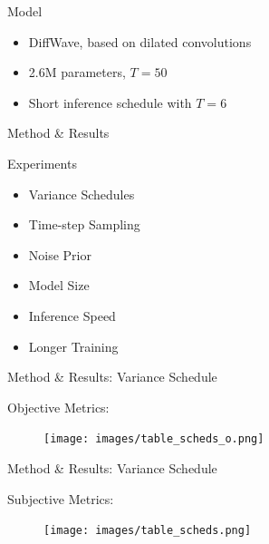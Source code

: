 \documentclass{beamer}
\begin{document}

\begin{frame}{Model}

\begin{itemize}
    \setlength\itemsep{1.5em}
    \item DiffWave, based on dilated convolutions
    \item 2.6M parameters, $T=50$
    \item Short inference schedule with $T=6$
\end{itemize}
    
\end{frame}



\begin{frame}{Method \& Results}

    Experiments

    \vspace{0.5cm}

    \begin{itemize}
        \setlength\itemsep{1.5em}
        \item Variance Schedules
        \item Time-step Sampling
        \item Noise Prior
        \item Model Size
        \item Inference Speed
        \item Longer Training
    \end{itemize}
    
\end{frame}


\begin{frame}{Method \& Results: Variance Schedule}

Objective Metrics:

    \begin{figure}[H]
        \centering
        \texttt{[image: images/table\_scheds\_o.png]}
    \end{figure}

\end{frame}


\begin{frame}{Method \& Results: Variance Schedule}

Subjective Metrics:

    \begin{figure}[H]
        \centering
        \texttt{[image: images/table\_scheds.png]}
    \end{figure}
    
\end{frame}
\end{document}
